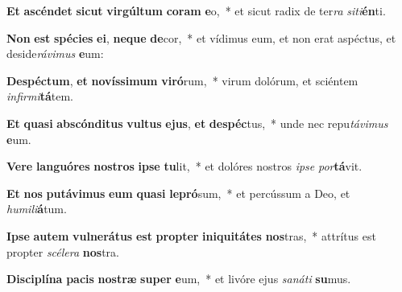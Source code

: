 \item \textbf{Et} \textbf{a}\textbf{scén}\textbf{det} \textbf{sic}\textbf{ut} \textbf{vir}\textbf{gúl}\textbf{tum} \textbf{co}\textbf{ram} \textbf{e}o,~* et sicut radix de ter\textit{ra} \textit{si}\textit{ti}\textbf{én}ti.
\item \textbf{Non} \textbf{est} \textbf{spé}\textbf{ci}\textbf{es} \textbf{e}\textbf{i}, \textbf{ne}\textbf{que} \textbf{de}cor,~* et vídimus eum, et non erat aspéctus, et deside\textit{rá}\textit{vi}\textit{mus} \textbf{e}um:
\item \textbf{De}\textbf{spéc}\textbf{tum}, \textbf{et} \textbf{no}\textbf{vís}\textbf{si}\textbf{mum} \textbf{vi}\textbf{ró}rum,~* virum dolórum, et sciéntem \textit{in}\textit{fir}\textit{mi}\textbf{tá}tem.
\item \textbf{Et} \textbf{qua}\textbf{si} \textbf{abs}\textbf{cón}\textbf{di}\textbf{tus} \textbf{vul}\textbf{tus} \textbf{e}\textbf{jus}, \textbf{et} \textbf{de}\textbf{spéc}tus,~* unde nec repu\textit{tá}\textit{vi}\textit{mus} \textbf{e}um.
\item \textbf{Ve}\textbf{re} \textbf{lan}\textbf{guó}\textbf{res} \textbf{nos}\textbf{tros} \textbf{ip}\textbf{se} \textbf{tu}lit,~* et dolóres nostros \textit{ip}\textit{se} \textit{por}\textbf{tá}vit.
\item \textbf{Et} \textbf{nos} \textbf{pu}\textbf{tá}\textbf{vi}\textbf{mus} \textbf{e}\textbf{um} \textbf{qua}\textbf{si} \textbf{le}\textbf{pró}sum,~* et percússum a Deo, et \textit{hu}\textit{mi}\textit{li}\textbf{á}tum.
\item \textbf{Ip}\textbf{se} \textbf{au}\textbf{tem} \textbf{vul}\textbf{ne}\textbf{rá}\textbf{tus} \textbf{est} \textbf{prop}\textbf{ter} \textbf{in}\textbf{i}\textbf{qui}\textbf{tá}\textbf{tes} \textbf{nos}tras,~* attrítus est propter \textit{scé}\textit{le}\textit{ra} \textbf{nos}tra.
\item \textbf{Di}\textbf{sci}\textbf{plí}\textbf{na} \textbf{pa}\textbf{cis} \textbf{nos}\textbf{træ} \textbf{su}\textbf{per} \textbf{e}um,~* et livóre ejus \textit{sa}\textit{ná}\textit{ti} \textbf{su}mus.
